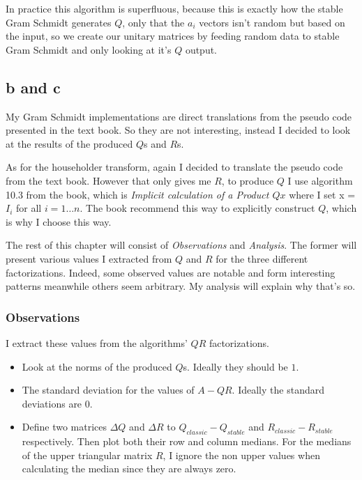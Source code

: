 \documentclass[a4paper,11pt]{article}
\begin{document}
In practice this algorithm is superfluous, because this is exactly
how the stable Gram Schmidt generates $Q$, only that the $a_i$ vectors isn't
random but based on the input, so we create our unitary matrices by feeding
random data to stable Gram Schmidt and only looking at it's $Q$ output.

\subsection{b and c}

My Gram Schmidt implementations are direct translations from the
pseudo code presented in the text book. So they are not interesting,
instead I decided to look at the results of the produced $Q$s and $R$s.

As for the householder transform, again I decided to translate the
pseudo code from the text book. However that only gives me $R$, to
produce $Q$ I use algorithm 10.3 from the book, which is
\emph{Implicit calculation of a Product $Qx$} where I set x = $I_i$ for
all $i = 1 \dots n$. The book recommend this way to explicitly construct
$Q$, which is why I choose this way.

The rest of this chapter will consist of \emph{Observations} and
\emph{Analysis}. The former will present various values I extracted from
$Q$ and $R$ for the three different factorizations. Indeed, some
observed values are notable and form interesting patterns meanwhile
others seem arbitrary. My analysis will explain why that's so.

\subsubsection{Observations}

I extract these values from the algorithms' $QR$ factorizations.

\begin{itemize}
  \item Look at the norms of the produced $Q$s. Ideally they should be $1$.
  \item The standard deviation for the values of $A-QR$. Ideally the
    standard deviations are $0$.
  \item Define two matrices $\Delta Q$ and $\Delta R$ to $Q_{classic} -
    Q_{stable}$ and $R_{classic} - R_{stable}$ respectively. Then plot both
    their row and column medians. For the medians of the upper
    triangular matrix $R$, I ignore the non upper values when
    calculating the median since they are always zero.

\end{itemize}
\end{document}
